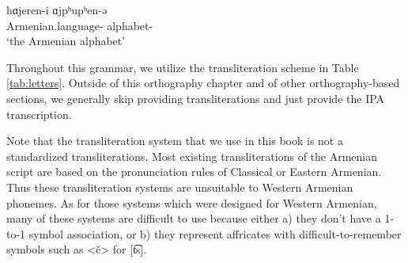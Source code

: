 \begin{exe}
	\ex \gll hɑjeren-i ɑjpʰupʰen-ə
	\\
	Armenian.language-{\gen} alphabet-{}
	\\
	\trans	`the Armenian alphabet'
	\label{example:ortho:name}
	\\
\end{exe}

Throughout this grammar, we utilize the transliteration scheme in Table \ref{tab:letters}.  Outside of this orthography chapter and of other orthography-based sections, we generally skip providing transliterations and just provide the IPA transcription. 

Note that the transliteration system that we use in this book is not a standardized transliterations. Most existing transliterations of the Armenian script are based on the pronunciation rules of Classical or Eastern Armenian. Thus these transliteration systems are unsuitable to Western Armenian phonemes. As for those systems which were designed for Western Armenian, many of these systems are difficult to use because either a) they don't have a 1-to-1 symbol association, or b) they represent affricates with difficult-to-remember symbols such as <č> for  [t͡s]. 


